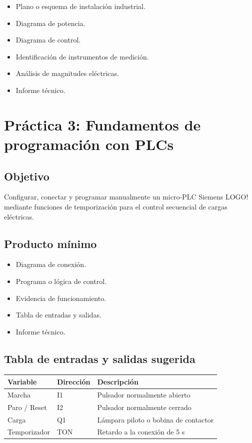 \documentclass[
  spanish,
  letterpaper,
  DIV=11,
  numbers=noendperiod]{scrreprt}
\newcounter{none} %
\providecommand{\tightlist}{%
  \setlength{\itemsep}{0pt}\setlength{\parskip}{0pt}}
\begin{document}
\begin{itemize}
\tightlist
\item
  Plano o esquema de instalación industrial.
\item
  Diagrama de potencia.
\item
  Diagrama de control.
\item
  Identificación de instrumentos de medición.
\item
  Análisis de magnitudes eléctricas.
\item
  Informe técnico.
\end{itemize}

\section{Práctica 3: Fundamentos de programación con
PLCs}\label{pruxe1ctica-3-fundamentos-de-programaciuxf3n-con-plcs}

\subsection{Objetivo}\label{objetivo-2}

Configurar, conectar y programar manualmente un micro-PLC Siemens LOGO!
mediante funciones de temporización para el control secuencial de cargas
eléctricas.

\subsection{Producto mínimo}\label{producto-muxednimo-2}

\begin{itemize}
\tightlist
\item
  Diagrama de conexión.
\item
  Programa o lógica de control.
\item
  Evidencia de funcionamiento.
\item
  Tabla de entradas y salidas.
\item
  Informe técnico.
\end{itemize}

\subsection{Tabla de entradas y salidas
sugerida}\label{tabla-de-entradas-y-salidas-sugerida}

{\def\LTcaptype{none} %
\begin{longtable}[]{@{}lll@{}}
\toprule\noalign{}
Variable & Dirección & Descripción \\
\midrule\noalign{}
\endhead
\bottomrule\noalign{}
\endlastfoot
Marcha & I1 & Pulsador normalmente abierto \\
Paro / Reset & I2 & Pulsador normalmente cerrado \\
Carga & Q1 & Lámpara piloto o bobina de contactor \\
Temporizador & TON & Retardo a la conexión de 5 s \\
\end{longtable}
}
\end{document}

